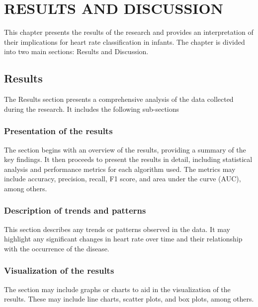 \section{RESULTS AND DISCUSSION}\label{sec:resultsanddiscussion}

This chapter presents the results of the research and provides an interpretation of their implications for heart rate classification in infants. The chapter is divided into two main sections: Results and Discussion.

\lipsum[100]

\subsection{Results}\label{sec:results}

The Results section presents a comprehensive analysis of the data collected during the research. It includes the following sub-sections

\subsubsection{Presentation of the results}\label{sec:presentationoftheresults}

The section begins with an overview of the results, providing a summary of the key findings. It then proceeds to present the results in detail, including statistical analysis and performance metrics for each algorithm used. The metrics may include accuracy, precision, recall, F1 score, and area under the curve (AUC), among others.

\subsubsection{Description of trends and patterns}\label{sec:descriptionoftrendsandpatterns}

This section describes any trends or patterns observed in the data. It may highlight any significant changes in heart rate over time and their relationship with the occurrence of the disease.

\subsubsection{Visualization of the results}\label{sec:visualizationoftheresults}

The section may include graphs or charts to aid in the visualization of the results. These may include line charts, scatter plots, and box plots, among others.

